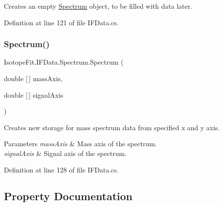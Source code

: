 Creates an empty \hyperlink{class_isotope_fit_1_1_i_f_data_1_1_spectrum}{Spectrum} object, to be filled with data later. 



Definition at line 121 of file I\+F\+Data.\+cs.

\mbox{\label{class_isotope_fit_1_1_i_f_data_1_1_spectrum_a0422d7cbabadc258d3dc6f1fd51f2e36}} 
\subsubsection{\texorpdfstring{Spectrum()}{Spectrum()}\hspace{0.1cm}{\footnotesize\ttfamily [2/2]}}
{\footnotesize\ttfamily Isotope\+Fit.\+I\+F\+Data.\+Spectrum.\+Spectrum (\begin{DoxyParamCaption}\item[{double \mbox{[}$\,$\mbox{]}}]{mass\+Axis,  }\item[{double \mbox{[}$\,$\mbox{]}}]{signal\+Axis }\end{DoxyParamCaption})}



Creates new storage for mass spectrum data from specified x and y axis. 


\begin{DoxyParams}{Parameters}
{\em mass\+Axis} & Mass axis of the spectrum.\\
\hline
{\em signal\+Axis} & Signal axis of the spectrum.\\
\hline
\end{DoxyParams}


Definition at line 128 of file I\+F\+Data.\+cs.



\subsection{Property Documentation}
\mbox{\label{class_isotope_fit_1_1_i_f_data_1_1_spectrum_a67e318d42b4eb69b14dd05238a670f79}} 

